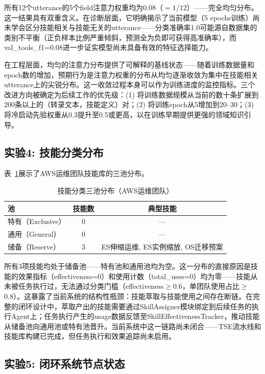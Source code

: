 \documentclass[conference]{IEEEtran}
\begin{document}
所有12个utterance的5个field注意力权重均为0.08（$=1/12$）——完全均匀分布。这一结果具有双重含义。在诊断层面，它明确揭示了当前模型（5 epochs训练）尚未学会区分技能相关与技能无关的utterance——分类准确率1.0可能源自数据集的类别不平衡（正负样本比例严重倾斜，预测全为负即可获得高准确率），而val\_tools\_f1=0.08进一步证实模型尚未具备有效的特征选择能力。

在工程层面，均匀的注意力分布提供了可解释的基线状态——随着训练数据量和epoch数的增加，预期行为是注意力权重的分布从均匀逐渐收敛为集中在技能相关utterance上的尖锐分布。这一收敛过程本身可以作为训练进度的监控指标。三个改进方向被确定为后续工作的优先级：(1) 将训练数据规模从当前的数十条扩展到200条以上的（转录文本，技能定义）对；(2) 将训练epoch从5增加到20--30；(3) 将冷启动先验权重从0.3提升至0.5或更高，以在训练早期提供更强的领域知识引导。

\subsection{实验4: 技能分类分布}

表~\ref{tab:classification}展示了AWS运维团队技能库的三池分布。

\begin{table}[t]
\centering
\caption{技能分类三池分布（AWS运维团队）}
\label{tab:classification}
\setlength{\tabcolsep}{3pt}
\begin{tabular}{lcc}
\toprule
池 & 技能数 & 典型技能 \\
\midrule
特有（Exclusive） & 0 & — \\
通用（General） & 0 & — \\
储备（Reserve） & 3 & ES伸缩运维, ES实例缩放, OS迁移预案 \\
\bottomrule
\end{tabular}
\end{table}

所有3项技能均处于储备池——特有池和通用池均为空。这一分布的直接原因是技能的效果指标（effectiveness=0）和使用计数（total\_uses=0）均为零——技能从未被任务执行过，无法通过分类门槛（effectiveness$\geq$0.6，单团队使用占比$\geq$0.8）。这暴露了当前系统的结构性瓶颈：技能萃取与技能使用之间存在断链。在完整的闭环设计中，萃取产出的技能需要通过SkillAssigner模块绑定到后续任务的执行Agent上；任务执行产生的usage数据反馈至SkillEffectivenessTracker，推动技能从储备池向通用池或特有池晋升。当前系统中这一链路尚未闭合——TSE流水线和技能库构建已完成，但任务执行和效果追踪尚未启用。

\subsection{实验5: 闭环系统节点状态}
\end{document}
